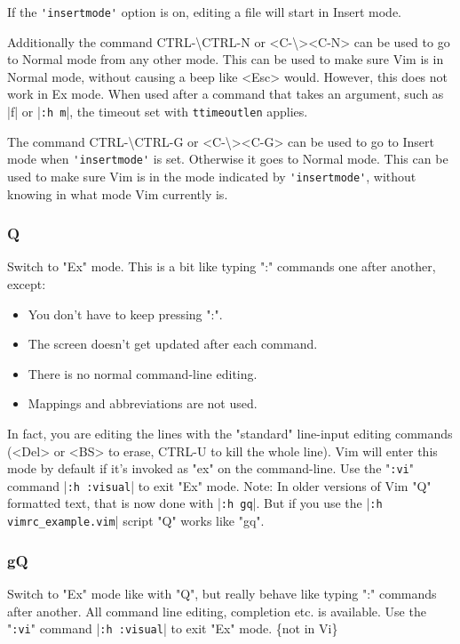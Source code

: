 If the \verb!'insertmode'! option is on, editing a file will start in Insert mode.

\label{CTRL-backslash_CTRL-N}
\label{i_CTRL-backslash_CTRL-N}
\label{c_CTRL-backslash_CTRL-N}
\label{v_CTRL-backslash_CTRL-N}
Additionally the command CTRL-\textbackslash CTRL-N or <C-\textbackslash><C-N> can be used to go to Normal mode from any other mode.
This can be used to make sure Vim is in Normal mode, without causing a beep like <Esc> would.
However, this does not work in Ex mode.
When used after a command that takes an argument, such as |f| or |\verb!:h m!|, the timeout set with \verb!ttimeoutlen! applies.

\label{CTRL-backslash_CTRL-G}
\label{i_CTRL-backslash_CTRL-G}
\label{c_CTRL-backslash_CTRL-G}
\label{v_CTRL-backslash_CTRL-G}
The command CTRL-\textbackslash CTRL-G or <C-\textbackslash><C-G> can be used to go to Insert mode when \verb!'insertmode'! is set.
Otherwise it goes to Normal mode.
This can be used to make sure Vim is in the mode indicated by \verb!'insertmode'!, without knowing in what mode Vim currently is.

\subsubsection{Q}
\label{Q}
\label{mode-Ex}
\label{Ex-mode}
\label{Ex}
\label{EX}
\label{E501}
Switch to "Ex" mode.
This is a bit like typing ":" commands one after another, except:
\begin{itemize}
				\item You don't have to keep pressing ":".
				\item The screen doesn't get updated after each command.
				\item There is no normal command-line editing.
				\item Mappings and abbreviations are not used.
\end{itemize}
In fact, you are editing the lines with the "standard" line-input editing commands (<Del> or <BS> to erase, CTRL-U to kill the whole line).
Vim will enter this mode by default if it's invoked as "ex" on the command-line.
Use the "\verb!:vi!" command |\verb!:h :visual!| to exit "Ex" mode.
Note: In older versions of Vim "Q" formatted text, that is now done with |\verb!:h gq!|.
But if you use the
|\verb!:h vimrc_example.vim!| script "Q" works like "gq".

\subsubsection{gQ}
\label{gQ}
Switch to "Ex" mode like with "Q", but really behave like typing ":" commands after another.
All command line editing, completion etc. is available.
Use the "\verb!:vi!" command |\verb!:h :visual!| to exit "Ex" mode.
\{not in Vi\}

